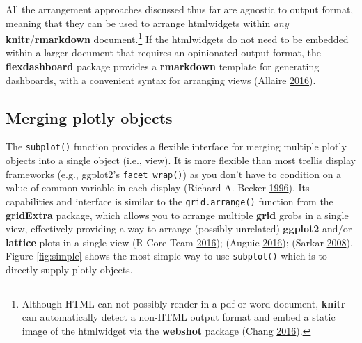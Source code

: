 \documentclass[12pt,]{isuthesis}
\newenvironment{Shaded}{\begin{snugshade}}{\end{snugshade}}
\newcommand{\KeywordTok}[1]{\textcolor[rgb]{0.13,0.29,0.53}{\textbf{{#1}}}}
\newcommand{\DataTypeTok}[1]{\textcolor[rgb]{0.13,0.29,0.53}{{#1}}}
\newcommand{\StringTok}[1]{\textcolor[rgb]{0.31,0.60,0.02}{{#1}}}
\newcommand{\NormalTok}[1]{{#1}}
\let\rmarkdownfootnote\footnote%
\def\footnote{\protect\rmarkdownfootnote}
\begin{document}
All the arrangement approaches discussed thus far are agnostic to output
format, meaning that they can be used to arrange htmlwidgets within
\emph{any} \textbf{knitr}/\textbf{rmarkdown} document.\footnote{Although
  HTML can not possibly render in a pdf or word document, \textbf{knitr}
  can automatically detect a non-HTML output format and embed a static
  image of the htmlwidget via the \textbf{webshot} package (Chang
  \protect\hyperlink{ref-webshot}{2016}).} If the htmlwidgets do not
need to be embedded within a larger document that requires an
opinionated output format, the \textbf{flexdashboard} package provides a
\textbf{rmarkdown} template for generating dashboards, with a convenient
syntax for arranging views (Allaire
\protect\hyperlink{ref-flexdashboard}{2016}).

\subsection{Merging plotly objects}\label{merging-plotly-objects}

The \texttt{subplot()} function provides a flexible interface for
merging multiple plotly objects into a single object (i.e., view). It is
more flexible than most trellis display frameworks (e.g., ggplot2's
\texttt{facet\_wrap()}) as you don't have to condition on a value of
common variable in each display (Richard A. Becker
\protect\hyperlink{ref-trellis}{1996}). Its capabilities and interface
is similar to the \texttt{grid.arrange()} function from the
\textbf{gridExtra} package, which allows you to arrange multiple
\textbf{grid} grobs in a single view, effectively providing a way to
arrange (possibly unrelated) \textbf{ggplot2} and/or \textbf{lattice}
plots in a single view (R Core Team
\protect\hyperlink{ref-RCore}{2016}); (Auguie
\protect\hyperlink{ref-gridExtra}{2016}); (Sarkar
\protect\hyperlink{ref-lattice}{2008}). Figure \ref{fig:simple} shows
the most simple way to use \texttt{subplot()} which is to directly
supply plotly objects.

\begin{Shaded}
\end{Shaded}
\end{document}
